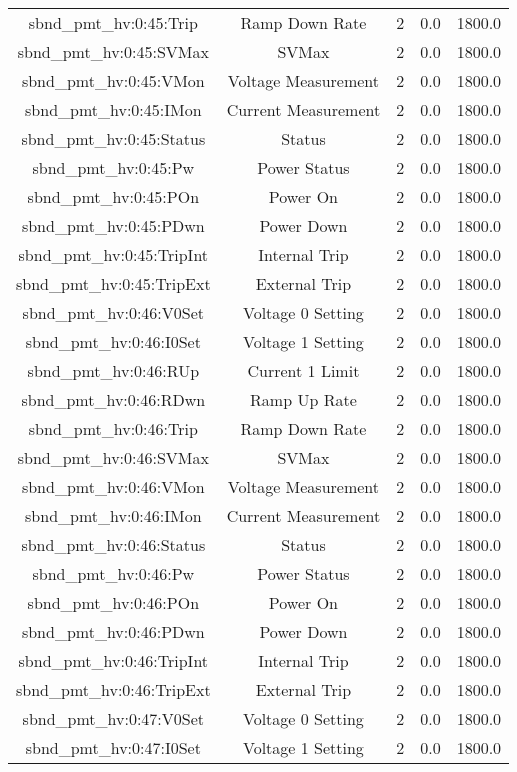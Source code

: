 \begin{center}
\begin{longtable}{c | c c c c }
sbnd\_pmt\_hv:0:45:Trip & Ramp Down Rate & 2 & 0.0 & 1800.0\\ 
sbnd\_pmt\_hv:0:45:SVMax & SVMax & 2 & 0.0 & 1800.0\\ 
sbnd\_pmt\_hv:0:45:VMon & Voltage Measurement & 2 & 0.0 & 1800.0\\ 
sbnd\_pmt\_hv:0:45:IMon & Current Measurement & 2 & 0.0 & 1800.0\\ 
sbnd\_pmt\_hv:0:45:Status & Status & 2 & 0.0 & 1800.0\\ 
sbnd\_pmt\_hv:0:45:Pw & Power Status & 2 & 0.0 & 1800.0\\ 
sbnd\_pmt\_hv:0:45:POn & Power On & 2 & 0.0 & 1800.0\\ 
sbnd\_pmt\_hv:0:45:PDwn & Power Down & 2 & 0.0 & 1800.0\\ 
sbnd\_pmt\_hv:0:45:TripInt & Internal Trip & 2 & 0.0 & 1800.0\\ 
sbnd\_pmt\_hv:0:45:TripExt & External Trip & 2 & 0.0 & 1800.0\\ 
sbnd\_pmt\_hv:0:46:V0Set & Voltage 0 Setting & 2 & 0.0 & 1800.0\\ 
sbnd\_pmt\_hv:0:46:I0Set & Voltage 1 Setting & 2 & 0.0 & 1800.0\\ 
sbnd\_pmt\_hv:0:46:RUp & Current 1 Limit & 2 & 0.0 & 1800.0\\ 
sbnd\_pmt\_hv:0:46:RDwn & Ramp Up Rate & 2 & 0.0 & 1800.0\\ 
sbnd\_pmt\_hv:0:46:Trip & Ramp Down Rate & 2 & 0.0 & 1800.0\\ 
sbnd\_pmt\_hv:0:46:SVMax & SVMax & 2 & 0.0 & 1800.0\\ 
sbnd\_pmt\_hv:0:46:VMon & Voltage Measurement & 2 & 0.0 & 1800.0\\ 
sbnd\_pmt\_hv:0:46:IMon & Current Measurement & 2 & 0.0 & 1800.0\\ 
sbnd\_pmt\_hv:0:46:Status & Status & 2 & 0.0 & 1800.0\\ 
sbnd\_pmt\_hv:0:46:Pw & Power Status & 2 & 0.0 & 1800.0\\ 
sbnd\_pmt\_hv:0:46:POn & Power On & 2 & 0.0 & 1800.0\\ 
sbnd\_pmt\_hv:0:46:PDwn & Power Down & 2 & 0.0 & 1800.0\\ 
sbnd\_pmt\_hv:0:46:TripInt & Internal Trip & 2 & 0.0 & 1800.0\\ 
sbnd\_pmt\_hv:0:46:TripExt & External Trip & 2 & 0.0 & 1800.0\\ 
sbnd\_pmt\_hv:0:47:V0Set & Voltage 0 Setting & 2 & 0.0 & 1800.0\\ 
sbnd\_pmt\_hv:0:47:I0Set & Voltage 1 Setting & 2 & 0.0 & 1800.0\\ 

\end{longtable}
\end{center}
